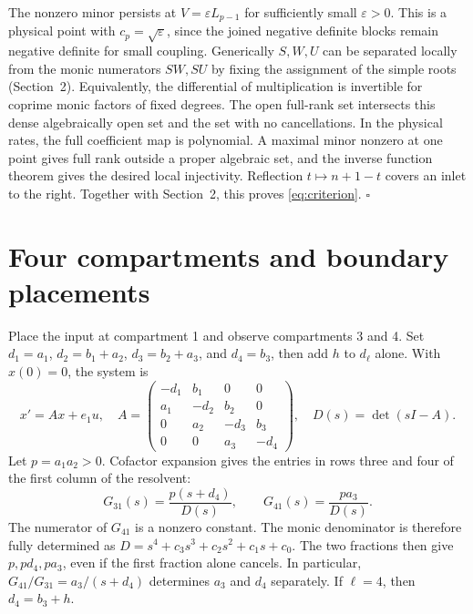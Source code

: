 \documentclass[11pt,a4paper]{article}
\newcommand{\sect}[1]{\section{#1}}
\begin{document}
The nonzero minor persists at \(V=\varepsilon L_{p-1}\) for sufficiently small \(\varepsilon>0\). This is a physical point with \(c_p=\sqrt{\varepsilon}\), since the joined negative definite blocks remain negative definite for small coupling. Generically \(S,W,U\) can be separated locally from the monic numerators \(SW,SU\) by fixing the assignment of the simple roots (Section~2). Equivalently, the differential of multiplication is invertible for coprime monic factors of fixed degrees. The open full-rank set intersects this dense algebraically open set and the set with no cancellations. In the physical rates, the full coefficient map is polynomial. A maximal minor nonzero at one point gives full rank outside a proper algebraic set, and the inverse function theorem gives the desired local injectivity. Reflection \(t\mapsto n+1-t\) covers an inlet to the right. Together with Section~2, this proves \eqref{eq:criterion}. \(\square\)


\sect{Four compartments and boundary placements}
Place the input at compartment 1 and observe compartments 3 and 4. Set \(d_1=a_1\), \(d_2=b_1+a_2\), \(d_3=b_2+a_3\), and \(d_4=b_3\), then add \(h\) to \(d_\ell\) alone. With \(x(0)=0\), the system is
\[
 x'=Ax+e_1u,\quad
 A=\begin{pmatrix}
 -d_1&b_1&0&0\\a_1&-d_2&b_2&0\\0&a_2&-d_3&b_3\\0&0&a_3&-d_4
 \end{pmatrix}\!,\quad D(s)=\det(sI-A).
\]
Let \(p=a_1a_2>0\). Cofactor expansion gives the entries in rows three and four of the first column of the resolvent:
\begin{equation}
 G_{31}(s)=\frac{p(s+d_4)}{D(s)},\qquad G_{41}(s)=\frac{p a_3}{D(s)}. \label{eq:four}
\end{equation}
The numerator of \(G_{41}\) is a nonzero constant. The monic denominator is therefore fully determined as \(D=s^4+c_3s^3+c_2s^2+c_1s+c_0\). The two fractions then give \(p,pd_4,pa_3\), even if the first fraction alone cancels. In particular, \(G_{41}/G_{31}=a_3/(s+d_4)\) determines \(a_3\) and \(d_4\) separately. If \(\ell=4\), then \(d_4=b_3+h\).
\end{document}
